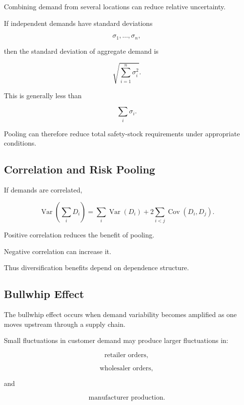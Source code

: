 Combining demand from several locations can reduce relative uncertainty.

If independent demands have standard deviations

\[
\sigma_1,\ldots,\sigma_n,
\]

then the standard deviation of aggregate demand is

\[
\boxed{
\sqrt{
\sum_{i=1}^{n}
\sigma_i^2
}.
}
\]

This is generally less than

\[
\sum_i\sigma_i.
\]

Pooling can therefore reduce total safety-stock requirements under
appropriate conditions.

\subsection{Correlation and Risk Pooling}
\label{subsec:correlation-risk-pooling}

If demands are correlated,

\[
\operatorname{Var}
\left(
\sum_iD_i
\right)
=
\sum_i
\operatorname{Var}(D_i)
+
2
\sum_{i<j}
\operatorname{Cov}(D_i,D_j).
\]

Positive correlation reduces the benefit of pooling.

Negative correlation can increase it.

Thus diversification benefits depend on dependence structure.

\subsection{Bullwhip Effect}
\label{subsec:bullwhip-effect}

The bullwhip effect occurs when demand variability becomes amplified as
one moves upstream through a supply chain.

Small fluctuations in customer demand may produce larger fluctuations in:

\[
\boxed{
\text{retailer orders},
}
\]

\[
\boxed{
\text{wholesaler orders},
}
\]

and

\[
\boxed{
\text{manufacturer production}.
}
\]

